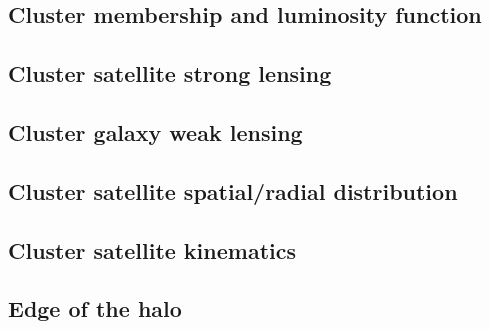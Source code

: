 
\subsection{Cluster membership and luminosity function}

\subsection{Cluster satellite strong lensing}

\subsection{Cluster galaxy weak lensing}

\subsection{Cluster satellite spatial/radial distribution}

\subsection{Cluster satellite kinematics}

\subsection{Edge of the halo}